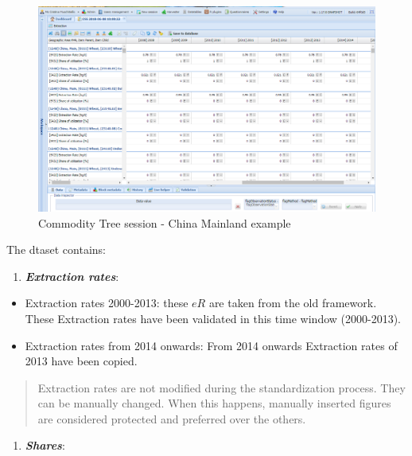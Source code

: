\documentclass[]{article}
\providecommand{\tightlist}{%
  \setlength{\itemsep}{0pt}\setlength{\parskip}{0pt}}
\begin{document}
\begin{figure}[H]

{\centering \includegraphics[width=0.9\linewidth]{images/commodityTree/05_session} 

}

\caption{\label{fig:f5}Commodity Tree session - China Mainland example}\label{fig:f5}
\end{figure}

The dtaset contains:

\begin{enumerate}
\def\labelenumi{\arabic{enumi}.}
\tightlist
\item
  \textbf{\emph{Extraction rates}}:
\end{enumerate}

\begin{itemize}
\tightlist
\item
  Extraction rates 2000-2013: these \(eR\) are taken from the old
  framework. These Extraction rates have been validated in this time
  window (2000-2013).
\item
  Extraction rates from 2014 onwards: From 2014 onwards Extraction rates
  of 2013 have been copied.
\end{itemize}

\begin{quote}
Extraction rates are not modified during the standardization process.
They can be manually changed. When this happens, manually inserted
figures are considered protected and preferred over the others.
\end{quote}

\begin{enumerate}
\def\labelenumi{\arabic{enumi}.}
\setcounter{enumi}{1}
\tightlist
\item
  \textbf{\emph{Shares}}:
\end{enumerate}
\end{document}
